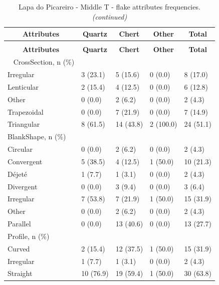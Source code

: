 \documentclass[12pt,twoside]{reedthesis}
\begin{document}
\begingroup\fontsize{9}{11}\selectfont
\begin{longtable}[t]{lllll}
\caption{\label{tab:flakeattributesLP2}Lapa do Picareiro - Middle T - flake attributes frequencies.}\\
\toprule
\multicolumn{1}{c}{\textbf{Attributes}} & \multicolumn{1}{c}{\textbf{Quartz}} & \multicolumn{1}{c}{\textbf{Chert}} & \multicolumn{1}{c}{\textbf{Other}} & \multicolumn{1}{c}{\textbf{Total}}\\
\midrule
\endfirsthead
\caption[]{\label{tab:flakeattributesLP2}Lapa do Picareiro - Middle T - flake attributes frequencies. \textit{(continued)}}\\
\toprule
\multicolumn{1}{c}{\textbf{Attributes}} & \multicolumn{1}{c}{\textbf{Quartz}} & \multicolumn{1}{c}{\textbf{Chert}} & \multicolumn{1}{c}{\textbf{Other}} & \multicolumn{1}{c}{\textbf{Total}}\\
\midrule
\endhead
\
\endfoot
\bottomrule
\endlastfoot
CrossSection, n (\%) &  &  &  & \\
Irregular & 3 (23.1) & 5 (15.6) & 0 (0.0) & 8 (17.0)\\
Lenticular & 2 (15.4) & 4 (12.5) & 0 (0.0) & 6 (12.8)\\
Other & 0 (0.0) & 2 (6.2) & 0 (0.0) & 2 \vphantom{1} (4.3)\\
Trapezoidal & 0 (0.0) & 7 (21.9) & 0 (0.0) & 7 (14.9)\\
\addlinespace
Triangular & 8 (61.5) & 14 (43.8) & 2 (100.0) & 24 (51.1)\\
BlankShape, n (\%) &  &  &  & \\
Circular & 0 (0.0) & 2 (6.2) & 0 (0.0) & 2 (4.3)\\
Convergent & 5 (38.5) & 4 (12.5) & 1 (50.0) & 10 (21.3)\\
Déjeté & 1 (7.7) & 1 (3.1) & 0 (0.0) & 2 (4.3)\\
\addlinespace
Divergent & 0 (0.0) & 3 (9.4) & 0 (0.0) & 3 (6.4)\\
Irregular & 7 (53.8) & 7 (21.9) & 1 (50.0) & 15 (31.9)\\
Other & 0 (0.0) & 2 (6.2) & 0 (0.0) & 2 (4.3)\\
Parallel & 0 (0.0) & 13 (40.6) & 0 (0.0) & 13 (27.7)\\
Profile, n (\%) &  &  &  & \\
\addlinespace
Curved & 2 (15.4) & 12 (37.5) & 1 (50.0) & 15 (31.9)\\
Irregular & 1 (7.7) & 1 (3.1) & 0 (0.0) & 2 (4.3)\\
Straight & 10 (76.9) & 19 (59.4) & 1 (50.0) & 30 (63.8)\\

\end{longtable}
\end{document}
